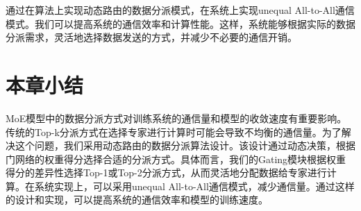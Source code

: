 通过在算法上实现动态路由的数据分派模式，在系统上实现unequal All-to-All通信模式。我们可以提高系统的通信效率和计算性能。这样，系统能够根据实际的数据分派需求，灵活地选择数据发送的方式，并减少不必要的通信开销。

\section{本章小结}

MoE模型中的数据分派方式对训练系统的通信量和模型的收敛速度有重要影响。传统的Top-k分派方式在选择专家进行计算时可能会导致不均衡的通信量。为了解决这个问题，我们采用动态路由的数据分派算法设计。该设计通过动态决策，根据门网络的权重得分选择合适的分派方式。具体而言，我们的Gating模块根据权重得分的差异性选择Top-1或Top-2分派方式，从而灵活地分配数据给专家进行计算。在系统实现上，可以采用unequal All-to-All通信模式，减少通信量。通过这样的设计和实现，可以提高系统的通信效率和模型的训练速度。

\endinput